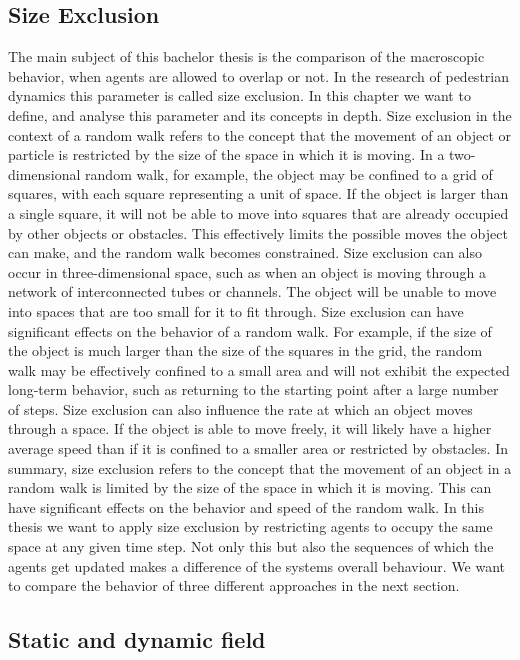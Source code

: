 \subsection{Size Exclusion}
The main subject of this bachelor thesis is the comparison of the macroscopic behavior, when agents are allowed to overlap or not.
In the research of pedestrian dynamics this parameter is called size exclusion. In this chapter we want to define, and analyse this parameter and its concepts in depth. 
Size exclusion in the context of a random walk refers to the concept that the movement of an object or particle is restricted by the size of the space in which it is moving.
In a two-dimensional random walk, for example, the object may be confined to a grid of squares, with each square representing a unit of space. 
If the object is larger than a single square, it will not be able to move into squares that are already occupied by other objects or obstacles. 
This effectively limits the possible moves the object can make, and the random walk becomes constrained.
Size exclusion can also occur in three-dimensional space, such as when an object is moving through a network of interconnected tubes or channels. 
The object will be unable to move into spaces that are too small for it to fit through.
Size exclusion can have significant effects on the behavior of a random walk. For example, if the size of the object is much larger than the size of the squares in the grid, 
the random walk may be effectively confined to a small area and will not exhibit the expected long-term behavior, such as returning to the starting point after a large number of steps.
Size exclusion can also influence the rate at which an object moves through a space. If the object is able to move freely, 
it will likely have a higher average speed than if it is confined to a smaller area or restricted by obstacles.
In summary, size exclusion refers to the concept that the movement of an object in a random walk is limited by the size of the space in which it is moving. 
This can have significant effects on the behavior and speed of the random walk.
In this thesis we want to apply size exclusion by restricting agents to occupy the same space at any given time step.
Not only this but also the sequences of which the agents get updated makes a difference of the systems overall behaviour.
We want to compare the behavior of three different approaches in the next section.

\subsection{Static and dynamic field}


